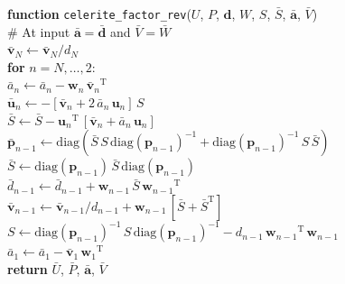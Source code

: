 \documentclass[rnaas]{aastex62}
\newcommand{\T}{\ensuremath{\mathrm{T}}}
\newcommand{\bvec}[1]{{\ensuremath{\boldsymbol{#1}}}}
\begin{document}
\medskip
\begin{minipage}{\linewidth}
\textbf{function} \texttt{celerite\_factor\_rev}($U$, $P$, $\bvec{d}$, $W$,
    $S$, $\bar{S}$, $\bar{\bvec{a}}$, $\bar{V}$) \\
\hspace*{2em}\textsf{\# At input $\bar{\bvec{a}} = \bar{\bvec{d}}$ and
    $\bar{V} = \bar{W}$}\\
    \hspace*{2em}$\bar{\bvec{v}}_N \gets \bar{\bvec{v}}_N / d_N$\\
\hspace*{2em}\textbf{for} $n = N,\ldots,2$:\\
\hspace*{2em}\hspace*{2em}$\bar{a}_n \gets \bar{a}_n -
    \bvec{w}_n\,{\bar{\bvec{v}}_n}^\T$\\
\hspace*{2em}\hspace*{2em}$\bar{\bvec{u}}_n \gets - [\bar{\bvec{v}}_n +
    2\,\bar{a}_n\,\bvec{u}_n]\,S$\\
\hspace*{2em}\hspace*{2em}$\bar{S} \gets \bar{S} -
    {\bvec{u}_n}^\T\,[\bar{\bvec{v}}_n + \bar{a}_n\,\bvec{u}_n]$\\
\hspace*{2em}\hspace*{2em}$\bar{\bvec{p}}_{n-1} \gets \mathrm{diag}(\bar{S}\,S
    \,\mathrm{diag}(\bvec{p}_{n-1})^{-1} + \mathrm{diag}(\bvec{p}_{n-1})^{-1}\,
    S\,\bar{S})$\\
\hspace*{2em}\hspace*{2em}$\bar{S} \gets \mathrm{diag}(\bvec{p}_{n-1})\,
    \bar{S}\,\mathrm{diag}(\bvec{p}_{n-1})$\\
\hspace*{2em}\hspace*{2em}$\bar{d}_{n-1} \gets \bar{d}_{n-1} +
    \bvec{w}_{n-1}\,\bar{S}\,{\bvec{w}_{n-1}}^\T$\\
\hspace*{2em}\hspace*{2em}$\bar{\bvec{v}}_{n-1} \gets \bar{\bvec{v}}_{n-1}
    / d_{n-1} + \bvec{w}_{n-1}\,[\bar{S} + \bar{S}^\T]$\\
\hspace*{2em}\hspace*{2em}$S \gets \mathrm{diag}(\bvec{p}_{n-1})^{-1}\,S\,
    \mathrm{diag}(\bvec{p}_{n-1})^{-1}
    - d_{n-1}\,{\bvec{w}_{n-1}}^\T\,\bvec{w}_{n-1}$\\
\hspace*{2em}$\bar{a}_1 \gets \bar{a}_1 -
    \bar{\bvec{v}}_1\,{\bvec{w}_1}^\T$\\
\hspace*{2em}\textbf{return} $\bar{U}$, $\bar{P}$, $\bar{\bvec{a}}$, $\bar{V}$
\end{minipage}
\medskip
\end{document}
